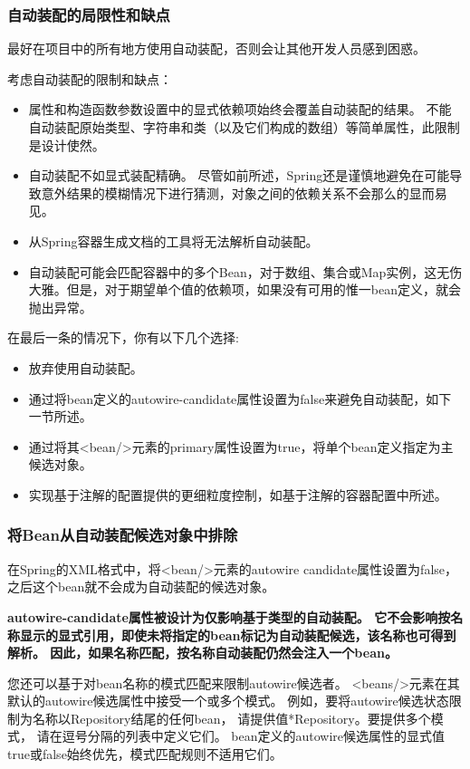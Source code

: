 \subsubsection{自动装配的局限性和缺点}
最好在项目中的所有地方使用自动装配，否则会让其他开发人员感到困惑。

考虑自动装配的限制和缺点：
\begin{itemize}
    \item 属性和构造函数参数设置中的显式依赖项始终会覆盖自动装配的结果。
    不能自动装配原始类型、字符串和类（以及它们构成的数组）等简单属性，此限制是设计使然。
    \item 自动装配不如显式装配精确。 尽管如前所述，Spring还是谨慎地避免在可能导致意外结果的模糊情况下进行猜测，对象之间的依赖关系不会那么的显而易见。
    \item 从Spring容器生成文档的工具将无法解析自动装配。
    \item 自动装配可能会匹配容器中的多个Bean，对于数组、集合或Map实例，这无伤大雅。但是，对于期望单个值的依赖项，如果没有可用的惟一bean定义，就会抛出异常。
\end{itemize}

在最后一条的情况下，你有以下几个选择:
\begin{itemize}
    \item 放弃使用自动装配。
    \item 通过将bean定义的autowire-candidate属性设置为false来避免自动装配，如下一节所述。
    \item 通过将其<bean/>元素的primary属性设置为true，将单个bean定义指定为主候选对象。
    \item 实现基于注解的配置提供的更细粒度控制，如基于注解的容器配置中所述。
\end{itemize}

\subsubsection{将Bean从自动装配候选对象中排除}
在Spring的XML格式中，将<bean/>元素的autowire candidate属性设置为false，
之后这个bean就不会成为自动装配的候选对象。

\textbf{autowire-candidate属性被设计为仅影响基于类型的自动装配。 它不会影响按名称显示的显式引用，即使未将指定的bean标记为自动装配候选，该名称也可得到解析。 因此，如果名称匹配，按名称自动装配仍然会注入一个bean。}



您还可以基于对bean名称的模式匹配来限制autowire候选者。
<beans/>元素在其默认的autowire候选属性中接受一个或多个模式。
例如，要将autowire候选状态限制为名称以Repository结尾的任何bean，
请提供值*Repository。要提供多个模式，
请在逗号分隔的列表中定义它们。
bean定义的autowire候选属性的显式值true或false始终优先，模式匹配规则不适用它们。

